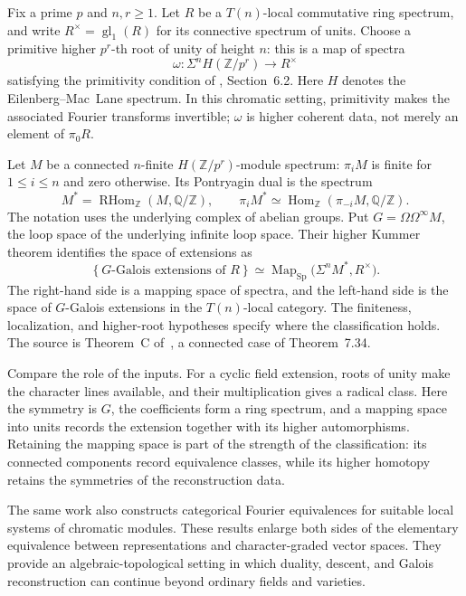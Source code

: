 \documentclass[11pt]{article}
\theoremstyle{remark}
\begin{document}
Fix a prime \(p\) and \(n,r\geq1\). Let \(R\) be a \(T(n)\)-local commutative ring spectrum, and write \(R^\times=\operatorname{gl}_1(R)\) for its connective spectrum of units. Choose a primitive higher \(p^r\)-th root of unity of height \(n\): this is a map of spectra
\[
\omega:\Sigma^n H(\mathbb Z/p^r)\longrightarrow R^\times
\]
satisfying the primitivity condition of \cite{chromatic}, Section~6.2. Here \(H\) denotes the Eilenberg--Mac~Lane spectrum. In this chromatic setting, primitivity makes the associated Fourier transforms invertible; \(\omega\) is higher coherent data, not merely an element of \(\pi_0R\).

Let \(M\) be a connected \(n\)-finite \(H(\mathbb Z/p^r)\)-module spectrum: \(\pi_iM\) is finite for \(1\leq i\leq n\) and zero otherwise. Its Pontryagin dual is the spectrum
\[
M^*=\operatorname{RHom}_{\mathbb Z}(M,\mathbb Q/\mathbb Z),
\qquad
\pi_iM^*\simeq\operatorname{Hom}_{\mathbb Z}(\pi_{-i}M,\mathbb Q/\mathbb Z).
\]
The notation uses the underlying complex of abelian groups. Put \(G=\Omega\Omega^\infty M\), the loop space of the underlying infinite loop space. Their higher Kummer theorem identifies the space of extensions as
\begin{equation}
\left\{G\text{-Galois extensions of }R\right\}
\simeq
\operatorname{Map}_{\mathrm{Sp}}\bigl(\Sigma^n M^*,R^\times\bigr).
\label{higher:kummer}
\end{equation}
The right-hand side is a mapping space of spectra, and the left-hand side is the space of \(G\)-Galois extensions in the \(T(n)\)-local category. The finiteness, localization, and higher-root hypotheses specify where the classification holds. The source is Theorem~C of~\cite{chromatic}, a connected case of Theorem~7.34.

Compare the role of the inputs. For a cyclic field extension, roots of unity make the character lines available, and their multiplication gives a radical class. Here the symmetry is \(G\), the coefficients form a ring spectrum, and a mapping space into units records the extension together with its higher automorphisms. Retaining the mapping space is part of the strength of the classification: its connected components record equivalence classes, while its higher homotopy retains the symmetries of the reconstruction data.

The same work also constructs categorical Fourier equivalences for suitable local systems of chromatic modules. These results enlarge both sides of the elementary equivalence between representations and character-graded vector spaces. They provide an algebraic-topological setting in which duality, descent, and Galois reconstruction can continue beyond ordinary fields and varieties.
\end{document}
